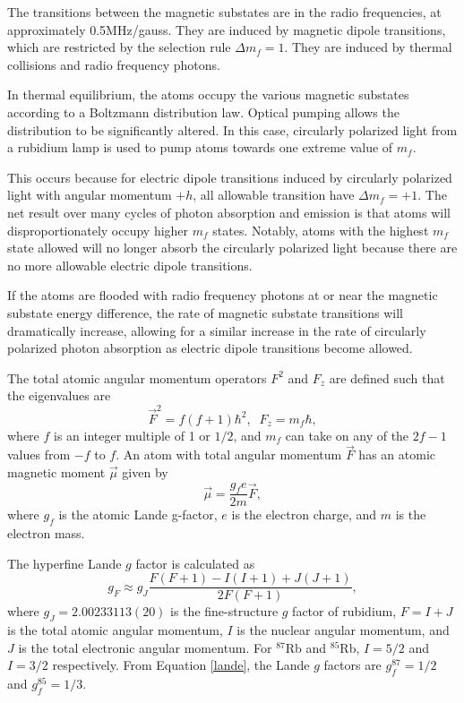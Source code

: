 The transitions between the magnetic substates are in the radio frequencies, at approximately 0.5MHz/gauss. They are induced by magnetic dipole transitions, which are restricted by the selection rule $\Delta m_f = 1$. They are induced by thermal collisions and radio frequency photons. 


In thermal equilibrium, the atoms occupy the various magnetic substates according to a Boltzmann distribution law. Optical pumping allows the distribution to be significantly altered. In this case, circularly polarized light from a rubidium lamp is used to pump atoms towards one extreme value of $m_f$. 

This occurs because for electric dipole transitions induced by circularly polarized light with angular momentum $+h$, all allowable transition have $\Delta m_f = +1$. The net result over many cycles of photon absorption and emission is that atoms will disproportionately occupy higher $m_f$ states. Notably, atoms with the highest $m_f$ state allowed will no longer absorb the circularly polarized light because there are no more allowable electric dipole transitions. 

If the atoms are flooded with radio frequency photons at or near the magnetic substate energy difference, the rate of magnetic substate transitions will dramatically increase, allowing for a similar increase in the rate of circularly polarized photon absorption as electric dipole transitions become allowed. 


The total atomic angular momentum operators $F^2$ and $F_z$ are defined such that the eigenvalues are
\begin{equation}
\overrightarrow{F}^{2} = f(f+1)\hbar^2, \;\; F_z = m_f \hbar,
\end{equation}
where $f$ is an integer multiple of 1 or $1/2$, and $m_f$ can take on any of the $2f-1$ values from $-f$ to $f$. An atom with total angular momentum $\overrightarrow{F}$ has an atomic magnetic moment $\overrightarrow{\mu}$ given by
\begin{equation}
\overrightarrow{\mu} = \frac{g_f e}{2 m} \overrightarrow{F},
\end{equation}
where $g_f$ is the atomic Lande g-factor, $e$ is the electron charge, and $m$ is the electron mass.

The hyperfine Lande $g$ factor is calculated as
\begin{equation}
g_F \approx g_J \frac{F(F+1)-I(I+1)+J(J+1)}{2F(F+1)}, \label{lande}
\end{equation}
where $g_J=2.00233113(20)$ \cite{amv} is the fine-structure $g$ factor of rubidium, $F=I+J$ is the total atomic angular momentum, $I$ is the nuclear angular momentum, and $J$ is the total electronic angular momentum. For $^{87}$Rb and $^{85}$Rb, $I=5/2$ and $I=3/2$ respectively. From Equation \ref{lande}, the Lande $g$ factors are $g_{f}^{87}=1/2$ and $g_{f}^{85}=1/3$. 

